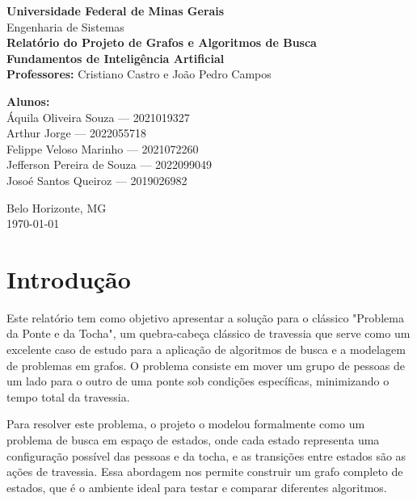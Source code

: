 \documentclass[12pt,a4paper]{article}
\begin{document}
\begin{titlepage}
    \centering
    {\Large \textbf{Universidade Federal de Minas Gerais}}\\[0.3cm]
    {\large Engenharia de Sistemas}\\[2cm]
    
    {\Huge \textbf{Relatório do Projeto de Grafos e Algoritmos de Busca}}\\[1.5cm]
    
    \textbf{Fundamentos de Inteligência Artificial}\\[0.5cm]
    \textbf{Professores:} Cristiano Castro e João Pedro Campos\\[1.5cm]
    
    \begin{flushleft}
        \textbf{Alunos:}\\
        Áquila Oliveira Souza --- 2021019327\\
        Arthur Jorge --- 2022055718\\
        Felippe Veloso Marinho --- 2021072260\\
        Jefferson Pereira de Souza --- 2022099049\\
        Josoé Santos Queiroz --- 2019026982
    \end{flushleft}
    
    \vfill
    {\large Belo Horizonte, MG}\\
    {\large \today}
\end{titlepage}

\tableofcontents
\newpage

\section{Introdução}
Este relatório tem como objetivo apresentar a solução para o clássico "Problema da Ponte e da Tocha", um quebra-cabeça clássico de travessia que serve como um excelente caso de estudo para a aplicação de algoritmos de busca e a modelagem de problemas em grafos. O problema consiste em mover um grupo de pessoas de um lado para o outro de uma ponte sob condições específicas, minimizando o tempo total da travessia.

Para resolver este problema, o projeto o modelou formalmente como um problema de busca em espaço de estados, onde cada estado representa uma configuração possível das pessoas e da tocha, e as transições entre estados são as ações de travessia. Essa abordagem nos permite construir um grafo completo de estados, que é o ambiente ideal para testar e comparar diferentes algoritmos.
\end{document}
